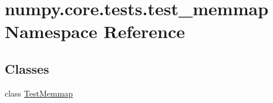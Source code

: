 \hypertarget{namespacenumpy_1_1core_1_1tests_1_1test__memmap}{}\section{numpy.\+core.\+tests.\+test\+\_\+memmap Namespace Reference}
\label{namespacenumpy_1_1core_1_1tests_1_1test__memmap}
\subsection*{Classes}
\begin{DoxyCompactItemize}
\item 
class \hyperlink{classnumpy_1_1core_1_1tests_1_1test__memmap_1_1TestMemmap}{Test\+Memmap}
\end{DoxyCompactItemize}
